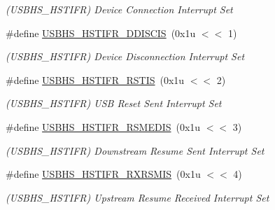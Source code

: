 \begin{DoxyCompactItemize}
\begin{DoxyCompactList}\small\item\em (U\+S\+B\+H\+S\+\_\+\+H\+S\+T\+I\+FR) Device Connection Interrupt Set \end{DoxyCompactList}\item 
\mbox{\label{group__SAMS70__USBHS_gac3321538a1390a9a9525af429a00b471}} 
\#define \mbox{\hyperlink{group__SAMS70__USBHS_gac3321538a1390a9a9525af429a00b471}{U\+S\+B\+H\+S\+\_\+\+H\+S\+T\+I\+F\+R\+\_\+\+D\+D\+I\+S\+C\+IS}}~(0x1u $<$$<$ 1)
\begin{DoxyCompactList}\small\item\em (U\+S\+B\+H\+S\+\_\+\+H\+S\+T\+I\+FR) Device Disconnection Interrupt Set \end{DoxyCompactList}\item 
\mbox{\label{group__SAMS70__USBHS_ga48da5d3e5cad30fa8fac9652f7584594}} 
\#define \mbox{\hyperlink{group__SAMS70__USBHS_ga48da5d3e5cad30fa8fac9652f7584594}{U\+S\+B\+H\+S\+\_\+\+H\+S\+T\+I\+F\+R\+\_\+\+R\+S\+T\+IS}}~(0x1u $<$$<$ 2)
\begin{DoxyCompactList}\small\item\em (U\+S\+B\+H\+S\+\_\+\+H\+S\+T\+I\+FR) U\+SB Reset Sent Interrupt Set \end{DoxyCompactList}\item 
\mbox{\label{group__SAMS70__USBHS_ga18272cc7c4f5f26e98dfccfc97bf59d6}} 
\#define \mbox{\hyperlink{group__SAMS70__USBHS_ga18272cc7c4f5f26e98dfccfc97bf59d6}{U\+S\+B\+H\+S\+\_\+\+H\+S\+T\+I\+F\+R\+\_\+\+R\+S\+M\+E\+D\+IS}}~(0x1u $<$$<$ 3)
\begin{DoxyCompactList}\small\item\em (U\+S\+B\+H\+S\+\_\+\+H\+S\+T\+I\+FR) Downstream Resume Sent Interrupt Set \end{DoxyCompactList}\item 
\mbox{\label{group__SAMS70__USBHS_ga30bc239e13c9189a98b21b67f4240fe9}} 
\#define \mbox{\hyperlink{group__SAMS70__USBHS_ga30bc239e13c9189a98b21b67f4240fe9}{U\+S\+B\+H\+S\+\_\+\+H\+S\+T\+I\+F\+R\+\_\+\+R\+X\+R\+S\+M\+IS}}~(0x1u $<$$<$ 4)
\begin{DoxyCompactList}\small\item\em (U\+S\+B\+H\+S\+\_\+\+H\+S\+T\+I\+FR) Upstream Resume Received Interrupt Set \end{DoxyCompactList}\item 

\end{DoxyCompactItemize}
